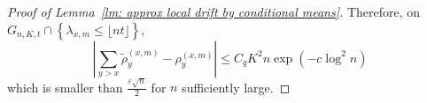 \documentclass[EJP]{ejpecp} %
\begin{document}
\begin{proof}[Proof of Lemma~\ref{lm: approx local drift by conditional means}]
	Therefore, on $G_{n,K,t} \cap \left\{ \lambda_{x,m} \leq\lfloor nt \rfloor \right\}$,
	\begin{equation}\label{eq: difference of cond means}
		\left| \sum_{y > x} \tilde\rho_y^{(x,m)} - \rho_y^{(x,m)} \right| \le 
		C_q K^2 n \exp \left( - c \log^2 n \right) 
	\end{equation}
	which is smaller than $\frac{\varepsilon \sqrt{n}}{2}$ for $n$ sufficiently large.
	
	


\end{proof}
\end{document}
